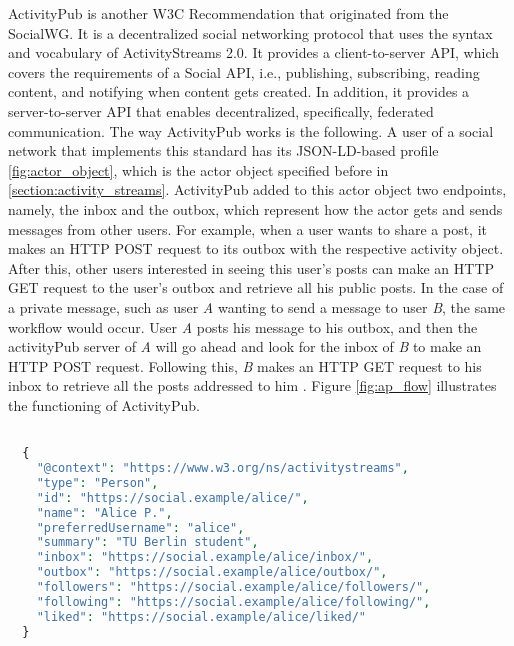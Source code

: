 ActivityPub is another W3C Recommendation that originated from the SocialWG. It is a decentralized social networking protocol that uses the syntax and vocabulary of ActivityStreams 2.0. It provides a client-to-server API, which covers the requirements of a Social API\cite{guy_2017}, i.e., publishing, subscribing, reading content, and notifying when content gets created. In addition, it provides a server-to-server API that enables decentralized, specifically, federated communication. The way ActivityPub works is the following. A user of a social network that implements this standard has its JSON-LD-based profile \ref{fig:actor_object}, which is the actor object specified before in \autoref{section:activity_streams}. ActivityPub added to this actor object two endpoints, namely, the inbox and the outbox, which represent how the actor gets and sends messages from other users. For example, when a user wants to share a post, it makes an HTTP POST request to its outbox with the respective activity object. After this, other users interested in seeing this user's posts can make an HTTP GET request to the user's outbox and retrieve all his public posts. In the case of a private message, such as user \emph{A} wanting to send a message to user \emph{B}, the same workflow would occur. User \emph{A} posts his message to his outbox, and then the activityPub server of \emph{A} will go ahead and look for the inbox of \emph{B} to make an HTTP POST request. Following this, \emph{B} makes an HTTP GET request to his inbox to retrieve all the posts addressed to him \cite{lemmer-webber_tallon_guy_prodromou_2018}. Figure \ref{fig:ap_flow} illustrates the functioning of ActivityPub. 

\lstset{style=JSONStyle}
\begin{lstlisting}[language=PHP, caption=Actor object example in ActivityPub \cite{lemmer-webber_tallon_guy_prodromou_2018}, label=fig:actor_object, float=h!]

  {
    "@context": "https://www.w3.org/ns/activitystreams",
    "type": "Person",
    "id": "https://social.example/alice/",
    "name": "Alice P.",
    "preferredUsername": "alice",
    "summary": "TU Berlin student",
    "inbox": "https://social.example/alice/inbox/",
    "outbox": "https://social.example/alice/outbox/",
    "followers": "https://social.example/alice/followers/",
    "following": "https://social.example/alice/following/",
    "liked": "https://social.example/alice/liked/"
  }
  
\end{lstlisting}

